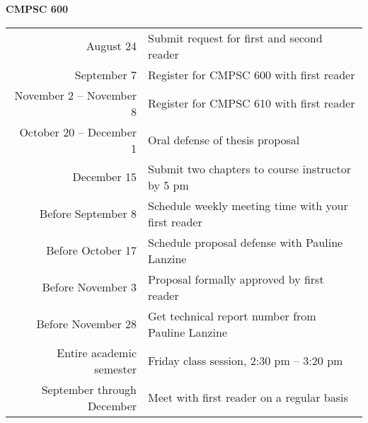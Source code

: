 {\bf CMPSC 600}
\begin{center}
\begin{tabular}{r|l}

\hline

August 24                & Submit request for first and second reader \\
September 7              & Register for CMPSC 600 with first reader \\
November 2 -- November 8 & Register for CMPSC 610 with first reader \\
October 20 -- December 1 & Oral defense of thesis proposal \\
December 15              & Submit two chapters to course instructor by 5 pm \\

\hline

Before September 8 & Schedule weekly meeting time with your first reader \\
Before October 17  & Schedule proposal defense with Pauline Lanzine \\
Before November 3  & Proposal formally approved by first reader \\
Before November 28 & Get technical report number from Pauline Lanzine \\

\hline

Entire academic semester   & Friday class session, 2:30 pm -- 3:20 pm \\
September through December & Meet with first reader on a regular basis \\

\hline

\end{tabular}
\end{center}



